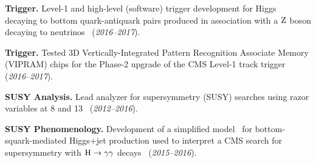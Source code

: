 \documentclass[12pt]{res}
\newcommand{\MR}{\ensuremath{M_\mathrm{R}}\xspace}
\newcommand{\Rtwo}{\ensuremath{\mathrm{R}^2}\xspace}
\begin{document}
\begin{resume}
\textbf{Trigger.} Level-1 and high-level (software) trigger development for Higgs decaying to
bottom quark-antiquark pairs produced in association with a $\mathrm{Z}$ boson
decaying to neutrinos~\cite{Sirunyan:2018kst} (\textit{2016--2017}).

\textbf{Trigger.} Tested 3D Vertically-Integrated Pattern Recognition
Associate Memory (VIPRAM) chips for the Phase-2 upgrade of the CMS Level-1
track trigger (\textit{2016--2017}).


\textbf{SUSY Analysis.} Lead analyzer for supersymmetry (SUSY) searches using
  razor variables at 8 and 13\TeV~\cite{razor8TeV,Khachatryan:2016epu} (\textit{2012--2016}).

\textbf{SUSY Phenomenology.} Development of a simplified model~\cite{Duarte:2017bbq}
  for bottom-squark-mediated Higgs$+$jet production used to interpret a
  CMS search for supersymmetry with $\mathrm{H}\to\gamma\gamma$
  decays~\cite{Sirunyan:2017eie} (\textit{2015--2016}).


\end{resume}
\end{document}
